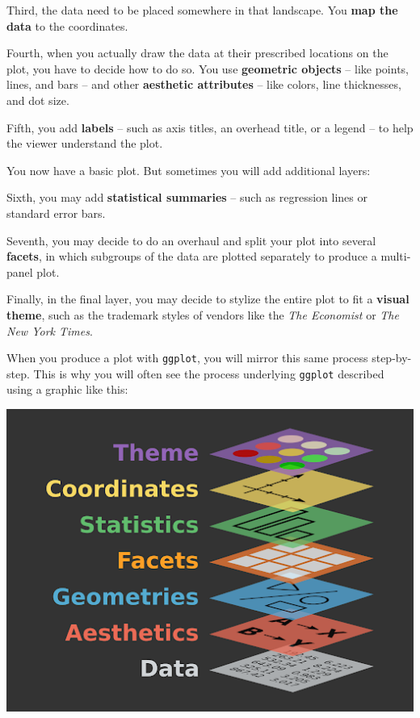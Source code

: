\documentclass[
]{book}
\begin{document}
Third, the data need to be placed somewhere in that landscape. You \textbf{map the data} to the coordinates.

Fourth, when you actually draw the data at their prescribed locations on the plot, you have to decide how to do so. You use \textbf{geometric objects} -- like points, lines, and bars -- and other \textbf{aesthetic attributes} -- like colors, line thicknesses, and dot size.

Fifth, you add \textbf{labels} -- such as axis titles, an overhead title, or a legend -- to help the viewer understand the plot.

You now have a basic plot. But sometimes you will add additional layers:

Sixth, you may add \textbf{statistical summaries} -- such as regression lines or standard error bars.

Seventh, you may decide to do an overhaul and split your plot into several \textbf{facets}, in which subgroups of the data are plotted separately to produce a multi-panel plot.

Finally, in the final layer, you may decide to stylize the entire plot to fit a \textbf{visual theme}, such as the trademark styles of vendors like the \emph{The Economist} or \emph{The New York Times}.

When you produce a plot with \texttt{ggplot}, you will mirror this same process step-by-step. This is why you will often see the process underlying \texttt{ggplot} described using a graphic like this:

\includegraphics{img/ggplot.png}

~
\end{document}
